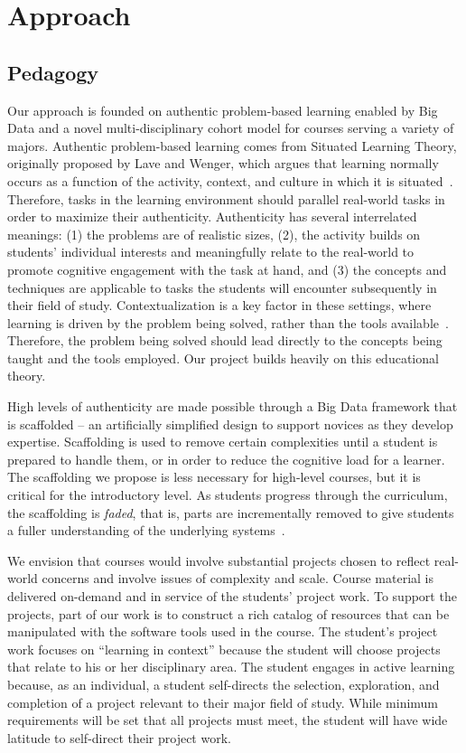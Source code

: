 \documentclass[11pt]{article}
\begin{document}
\section{Approach}

\subsection{Pedagogy}

Our approach is founded on authentic problem-based learning enabled by
Big Data and a novel multi-disciplinary cohort model for courses
serving a variety of majors. Authentic problem-based learning comes
from Situated Learning Theory, originally proposed by Lave and Wenger,
which argues that learning normally occurs as a function of the
activity, context, and culture in which it is
situated~\cite{lave-situated}.
Therefore, tasks in the learning environment should parallel
real-world tasks in order to maximize their authenticity.
Authenticity has several interrelated meanings: (1) the problems are
of realistic sizes, (2), the activity builds on students' individual
interests and meaningfully relate to the real-world to promote
cognitive engagement with the task at hand, and (3) the concepts and
techniques are applicable to tasks the students will encounter
subsequently in their field of study. Contextualization is a key
factor in these settings, where learning is driven by the problem
being solved, rather than the tools
available~\cite{heeter-comparison}.
Therefore, the problem being solved should lead directly to the concepts being taught and the tools employed. Our project builds heavily on this educational theory.

High levels of authenticity are made possible through a Big Data
framework that is scaffolded -- an artificially simplified design to
support novices as they develop expertise. Scaffolding is used to
remove certain complexities until a student is prepared to handle
them, or in order to reduce the cognitive load for a learner. The
scaffolding we propose is less necessary for high-level courses, but
it is critical for the introductory level. As students progress
through the curriculum, the scaffolding is \textit{faded}, that is,
parts are incrementally removed to give students a fuller
understanding of the underlying systems~\cite{situated-cognition}.

We envision that courses would involve substantial projects chosen to reflect real-world concerns and involve issues of complexity and scale. Course material is delivered on-demand and in service of the students' project work. To support the projects, part of our work is to construct a rich catalog of resources that can be manipulated with the software tools used in the course. The student's project work focuses on ``learning in context'' because the student will choose projects that relate to his or her disciplinary area. The student engages in active learning because, as an individual, a student self-directs the selection, exploration, and completion of a project relevant to their major field of study. While minimum requirements will be set that all projects must meet, the student will have wide latitude to self-direct their project work. 
\end{document}
